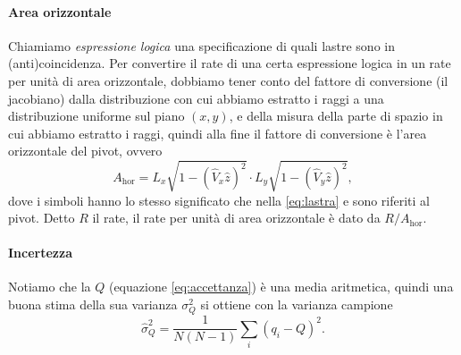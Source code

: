 \paragraph{Area orizzontale}

Chiamiamo \emph{espressione logica} una specificazione di quali lastre sono in (anti)coincidenza.
Per convertire il rate di una certa espressione logica in un rate per unità di area orizzontale,
dobbiamo tener conto del fattore di conversione (il jacobiano)
dalla distribuzione con cui abbiamo estratto i raggi a una distribuzione uniforme sul piano $(x,y)$,
e della misura della parte di spazio in cui abbiamo estratto i raggi,
quindi alla fine il fattore di conversione è l'area orizzontale del pivot,
ovvero
\begin{equation*}
	A_\text{hor} = L_x \sqrt{1-(\hat V_x\hat z)^2} \cdot L_y \sqrt{1-(\hat V_y\hat z)^2},
\end{equation*}
dove i simboli hanno lo stesso significato che nella \eqref{eq:lastra}
e sono riferiti al pivot.
Detto $R$ il rate, il rate per unità di area orizzontale è dato da $R/A_\text{hor}$.

\paragraph{Incertezza}

Notiamo che la $Q$ (equazione \ref{eq:accettanza}) è una media aritmetica,
quindi una buona stima della sua varianza $\sigma_Q^2$ si ottiene con la varianza campione
\begin{equation*}
	\hat\sigma_Q^2
	= \frac1{N(N-1)} \sum_i (q_i - Q)^2.
\end{equation*}
